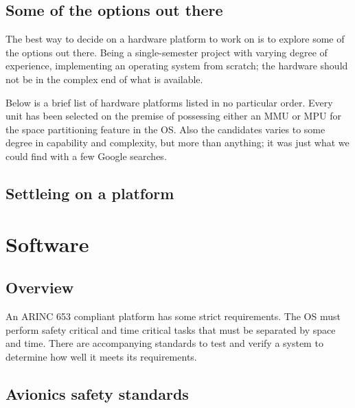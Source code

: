 \subsection{Some of the options out there}
The best way to decide on a hardware platform to work on is to explore some of the options out there.
Being a single-semester project with varying degree of experience,
implementing an operating system from scratch;
the hardware should not be in the complex end of what is available.

Below is a brief list of hardware platforms listed in no particular order.
Every unit has been selected on the premise of possessing either an MMU or MPU for the space partitioning feature in the OS.
Also the candidates varies to some degree in capability and complexity,
but more than anything; it was just what we could find with a few Google searches.

\subsection{Settleing on a platform}


\section{Software}
\subsection{Overview}

An ARINC 653 compliant platform has some strict requirements. The OS must perform safety critical and time critical tasks that must be separated by space and time. There are accompanying standards to test and verify a system to determine how well it meets its requirements. 

\subsection{Avionics safety standards}
